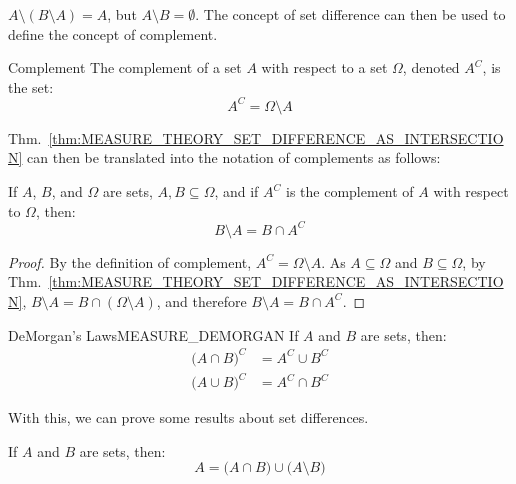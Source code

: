             $A\setminus(B\setminus{A})=A$, but $A\setminus{B}=\emptyset$.
            The concept of set difference can then be used to define the
            concept of complement.
            \begin{ldefinition}{Complement}
                The complement of a set $A$ with respect to a set
                $\Omega$, denoted $A^{C}$, is the set:
                \begin{equation}
                    A^{C}=\Omega\setminus{A}
                \end{equation}
            \end{ldefinition}
            Thm.~\ref{thm:MEASURE_THEORY_SET_DIFFERENCE_AS_INTERSECTION} can then
            be translated into the notation of complements as follows:
            \begin{theorem}
                If $A$, $B$, and $\Omega$ are sets, $A,B\subseteq\Omega$,
                and if $A^{C}$ is the complement of $A$ with respect
                to $\Omega$, then:
                \begin{equation}
                    B\setminus{A}=B\cap{A}^{C}
                \end{equation}
            \end{theorem}
            \begin{proof}
                By the definition of complement, $A^{C}=\Omega\setminus{A}$.
                As $A\subseteq\Omega$ and $B\subseteq\Omega$, by
                Thm.~\ref{thm:MEASURE_THEORY_SET_DIFFERENCE_AS_INTERSECTION},
                $B\setminus{A}=B\cap(\Omega\setminus{A})$, and therefore
                $B\setminus{A}=B\cap{A}^{C}$.
            \end{proof}
            \begin{ftheorem}{DeMorgan's Laws}{MEASURE_DEMORGAN}
                If $A$ and $B$ are sets, then:
                \begin{subequations}
                    \begin{align}
                        \big(A\cap{B}\big)^{C}
                        &=A^{C}\cup{B}^{C}\\
                        \big(A\cup{B}\big)^{C}
                        &=A^{C}\cap{B}^{C}
                    \end{align}
                \end{subequations}
            \end{ftheorem}
            With this, we can prove some results about set differences.
            \begin{theorem}
                If $A$ and $B$ are sets, then:
                \begin{equation}
                    A=\big(A\cap{B}\big)\cup\big(A\setminus{B}\big)
                \end{equation}
            \end{theorem}

